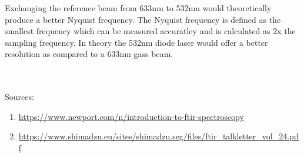 \documentclass[titlepage]{article}
\begin{document}
\par Exchanging the reference beam from 633nm to 532nm would theoretically produce a better Nyquist frequency. The Nyquist frequency is defined as the smallest frequency which can be measured accuratley and is calculated as 2x the sampling frequency. In theory the 532nm diode laser would offer a better resolution as compared to a 633nm gass beam. \\ \\ \\

\begin{small}
    Sources:
    \begin{enumerate}
        \item  \url{https://www.newport.com/n/introduction-to-ftir-spectroscopy}
        \item \url{https://www.shimadzu.eu/sites/shimadzu.seg/files/ftir_talkletter_vol_24.pdf}
    \end{enumerate}
\end{small}
\end{document}
